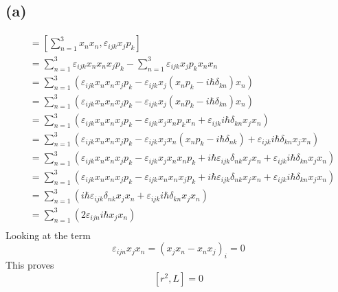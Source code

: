 \documentclass[letter, 10pts]{article}
\newcommand{\hb}{\hbar}
\begin{document}
\subsection*{(a)} 
\begin{align*}
	[r^2, L] &= \left[\sum_{n=1}^{3} x_n x_n , \varepsilon_{ijk} x_j p_k  \right] \\
		 &= \sum_{n=1}^{3} \varepsilon_{ijk} x_n x_n x_j p_k - \sum_{n=1}^{3} \varepsilon_{ijk} x_j p_k x_n x_n  \\
		 &= \sum_{n=1}^{3} \left(\varepsilon_{ijk} x_n x_n x_j p_k - \varepsilon_{ijk} x_j (x_n p_k - i \hb \delta_{kn} ) x_n \right) \\
		 &= \sum_{n=1}^{3} \left(\varepsilon_{ijk} x_n x_n x_j p_k - \varepsilon_{ijk} x_j (x_n p_k - i \hb \delta_{kn} ) x_n \right) \\
		 &= \sum_{n=1}^{3} \left(\varepsilon_{ijk} x_n x_n x_j p_k - \varepsilon_{ijk} x_j x_n p_k x_n + \varepsilon_{ijk} i \hb \delta_{kn} x_j x_n  \right) \\
		 &= \sum_{n=1}^{3} \left(\varepsilon_{ijk} x_n x_n x_j p_k - \varepsilon_{ijk} x_j x_n (x_n p_k - i \hb \delta_{nk} ) + \varepsilon_{ijk} i \hb \delta_{kn} x_j x_n  \right) \\
		 &= \sum_{n=1}^{3} \left(\varepsilon_{ijk} x_n x_n x_j p_k - \varepsilon_{ijk} x_j x_n x_n p_k + i \hb \varepsilon_{ijk} \delta_{nk} x_j x_n + \varepsilon_{ijk} i \hb \delta_{kn} x_j x_n  \right) \\
		 &= \sum_{n=1}^{3} \left(\varepsilon_{ijk} x_n x_n x_j p_k - \varepsilon_{ijk} x_n x_n x_j p_k + i \hb \varepsilon_{ijk} \delta_{nk} x_j x_n + \varepsilon_{ijk} i \hb \delta_{kn} x_j x_n  \right) \\
		 &= \sum_{n=1}^{3} \left(i \hb \varepsilon_{ijk} \delta_{nk} x_j x_n + \varepsilon_{ijk} i \hb \delta_{kn} x_j x_n  \right) \\
		 &= \sum_{n=1}^{3} \left( 2 \varepsilon_{ijn} i \hb x_j x_n  \right) \\
\end{align*}
Looking at the term 
\[
	\varepsilon_{ijn} x_j x_n = (x_j x_n - x_n x_j )_i = 0  
\] 
This proves 
\[[
	r^2, L ] = 0
\] 
\end{document}
